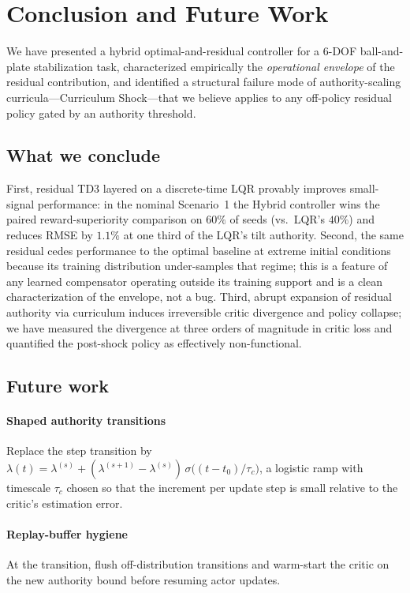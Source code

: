 \documentclass[conference]{IEEEtran}
\begin{document}
\section{Conclusion and Future Work}
\label{sec:conclusion}
We have presented a hybrid optimal-and-residual controller for a 6-DOF
ball-and-plate stabilization task, characterized empirically the
\emph{operational envelope} of the residual contribution, and identified a
structural failure mode of authority-scaling curricula---Curriculum Shock---that
we believe applies to any off-policy residual policy gated by an authority
threshold.

\subsection{What we conclude}
First, residual TD3 layered on a discrete-time LQR provably improves
small-signal performance: in the nominal Scenario~1 the Hybrid controller
wins the paired reward-superiority comparison on $60\%$ of seeds (vs.\
LQR's $40\%$) and reduces RMSE by $1.1\%$ at one third of the LQR's tilt
authority. Second, the same residual cedes performance to the optimal
baseline at extreme initial conditions because its training distribution
under-samples that regime; this is a feature of any learned compensator
operating outside its training support and is a clean characterization of
the envelope, not a bug. Third, abrupt expansion of residual authority via
curriculum induces irreversible critic divergence and policy collapse; we
have measured the divergence at three orders of magnitude in critic loss
and quantified the post-shock policy as effectively non-functional.

\subsection{Future work}
\label{sec:future}
\paragraph*{Shaped authority transitions} Replace the step transition by
$\lambda(t) = \lambda^{(s)} + (\lambda^{(s+1)}-\lambda^{(s)})\,\sigma\!\big((t-t_0)/\tau_c\big)$,
a logistic ramp with timescale $\tau_c$ chosen so that the increment per
update step is small relative to the critic's estimation error.
\paragraph*{Replay-buffer hygiene} At the transition, flush off-distribution
transitions and warm-start the critic on the new authority bound before
resuming actor updates.
\end{document}
